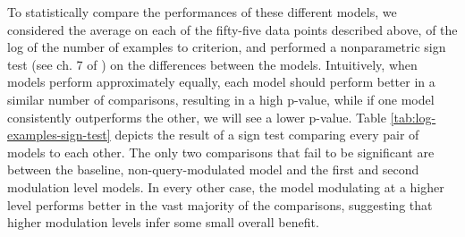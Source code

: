 To statistically compare the performances of these different models, we considered the average on each of the fifty-five data points described above, of the log of the number of examples to criterion, and performed a nonparametric sign test (see ch. 7 of \cite{Kvam2007}) on the differences between the models. Intuitively, when models perform approximately equally, each model should perform better in a similar number of comparisons, resulting in a high p-value, while if one model consistently outperforms the other, we will see a lower p-value. Table \ref{tab:log-examples-sign-test} depicts the result of a sign test comparing every pair of models to each other. The only two comparisons that fail to be significant are between the baseline, non-query-modulated model and the first and second modulation level models. In every other case, the model modulating at a higher level performs better in the vast majority of the comparisons, suggesting that higher modulation levels infer some small overall benefit. 
